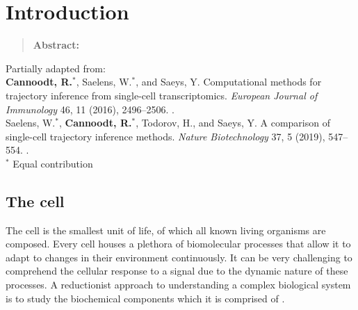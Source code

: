 \newpage{\thispagestyle{empty}\cleardoublepage}
\chapter{Introduction} 
\label{chap:introduction}

\begin{quote}
	\textbf{Abstract:} 
	
\end{quote}

\vfill

Partially adapted from:\\
\textbf{Cannoodt, R.}$^*$, Saelens, W.$^*$, and Saeys, Y. Computational methods for trajectory inference from single-cell transcriptomics. \textit{European Journal of Immunology} 46, 11 (2016), 2496--2506. .\\
Saelens, W.$^*$, \textbf{Cannoodt, R.}$^*$, Todorov, H., and Saeys, Y. A comparison of single-cell trajectory inference methods. \textit{Nature Biotechnology} 37, 5 (2019), 547--554. .\\
{\footnotesize $^*$ Equal contribution}

\newpage

\section{The cell}
The cell is the smallest unit of life, of which all known living organisms are composed. Every cell houses a plethora of biomolecular processes that allow it to adapt to changes in their environment continuously. It can be very challenging to comprehend the cellular response to a signal due to the dynamic nature of these processes. A reductionist approach to understanding a complex biological system is to study the biochemical components which it is comprised of \cite{brigandt_reductionismbiology_2017}.

